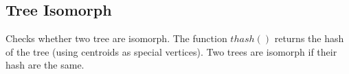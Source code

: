\subsection{Tree Isomorph}

Checks whether two tree are isomorph. 
The function $thash()$ returns the hash of the tree (using centroids as special vertices).
Two trees are isomorph if their hash are the same.
